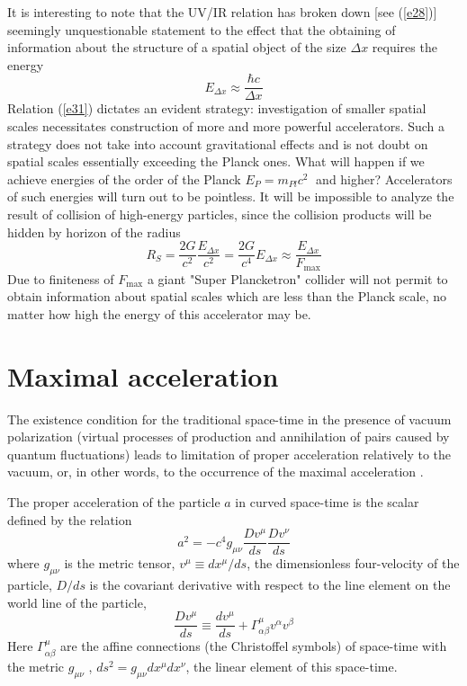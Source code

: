 \documentclass [12pt]{article}
\begin{document}
It is interesting to note that the UV/IR relation has broken down  [see (\ref{e28})] seemingly  unquestionable statement to the effect that the obtaining of  information about the structure of a spatial object of the size $\Delta x$ requires the energy
\begin{equation}\label{e31}
  {E_{\Delta x}} \approx \frac{{\hbar c}}{{\Delta x}}
\end{equation}
Relation (\ref{e31}) dictates an evident strategy:  investigation of smaller spatial scales necessitates construction of more and more powerful accelerators. Such a strategy does not take into account gravitational effects and is not doubt on spatial scales essentially exceeding the Planck ones. What will happen if we achieve energies of the order of the Planck ${E_P} = {m_{Pl}}{c^2}\;$ and higher? Accelerators of such energies will turn out to be pointless. It will be impossible to analyze the result of collision of high-energy particles, since the collision products will be hidden by  horizon of the radius
\begin{equation}\label{e32}
  {R_S} = \frac{{2G}}{{{c^2}}}\frac{{{E_{\Delta x}}}}{{{c^2}}} = \frac{{2G}}{{{c^4}}}{E_{\Delta x}} \approx \frac{{{E_{\Delta x}}}}{{{F_{\max }}}}
\end{equation}
Due to finiteness of ${F_{\max }}$ a giant "Super Plancketron" collider \cite{s28} will not permit to obtain  information  about spatial scales which are less than the Planck scale, no matter how high the energy of this accelerator may be.

\section{Maximal acceleration}

The existence condition for the traditional space-time in the presence of  vacuum polarization (virtual processes of production and annihilation of pairs caused by quantum fluctuations) leads to limitation of proper acceleration relatively to the vacuum, or, in other words, to the occurrence of the maximal acceleration \cite{s29,s30,s31,s32}.

The  proper  acceleration    of  the particle $a$ in  curved  space-time is the scalar defined by the relation
\begin{equation}\label{e33}
  {a^2} =  - {c^4}{g_{\mu \nu }}\frac{{D{v^\mu }}}{{ds}}\frac{{D{v^\nu }}}{{ds}}
\end{equation}
where ${g_{\mu \nu }}$ is the metric  tensor, ${v^\mu } \equiv d{x^\mu }/ds$, the dimensionless four-velocity  of the particle, $D/ds$ is the  covariant  derivative  with respect  to  the line element on the world line of the particle,
\begin{equation}\label{e34}
  \frac{{D{v^\mu }}}{{ds}} \equiv \frac{{d{v^\mu }}}{{ds}} + \Gamma _{\alpha \beta }^\mu {v^\alpha }{v^\beta }
\end{equation}
Here $\Gamma _{\alpha \beta }^\mu$ are the affine connections  (the Christoffel symbols) of  space-time  with the metric  ${g_{\mu \nu }}$ , $d{s^2} = {g_{\mu \nu }}d{x^\mu }d{x^\nu }$, the linear element of this space-time.
\end{document}
